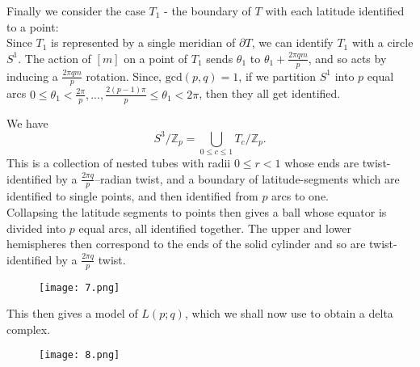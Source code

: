 \documentclass{article}
\begin{document}
\noindent Finally we consider the case $T_1$ - the boundary of $T$ with each latitude identified to a point:\\
Since $T_1$ is represented by a single meridian of $\partial T$, we can identify $T_1$ with a circle $S^1$. The action of $[m]$ on a point of $T_1$ sends $\theta_1$ to $\theta_1+\frac{2\pi qm}{p}$, and so acts by inducing a $\frac{2\pi qm}{p}$ rotation. Since, $\text{gcd}(p,q)=1$, if we partition $S^1$ into $p$ equal arcs $0\leq\theta_1<\frac{2\pi}{p},...,\frac{2(p-1)\pi}{p}\leq\theta_1<2\pi$, then they all get identified.

\noindent We have \[S^3/\mathbb{Z}_p=\bigcup_{0\leq c\leq 1}T_c/\mathbb{Z}_p.\] This is a collection of nested tubes with radii $0\leq r<1$ whose ends are twist-identified by a $\frac{2\pi q}{p}$--radian twist, and a boundary of latitude-segments which are identified to single points, and then identified from $p$ arcs to one.\\

\noindent Collapsing the latitude segments to points then gives a ball whose equator is divided into $p$ equal arcs, all identified together. The upper and lower hemispheres then correspond to the ends of the solid cylinder and so are twist-identified by a $\frac{2\pi q}{p}$ twist.

\begin{figure} [hbt!]
    \centering
    \texttt{[image: 7.png]}
\end{figure}


This then gives a model of $L(p;q)$, which we shall now use to obtain a delta complex.

\begin{figure} [hbt!]
    \centering
    \texttt{[image: 8.png]}
\end{figure}
\end{document}
